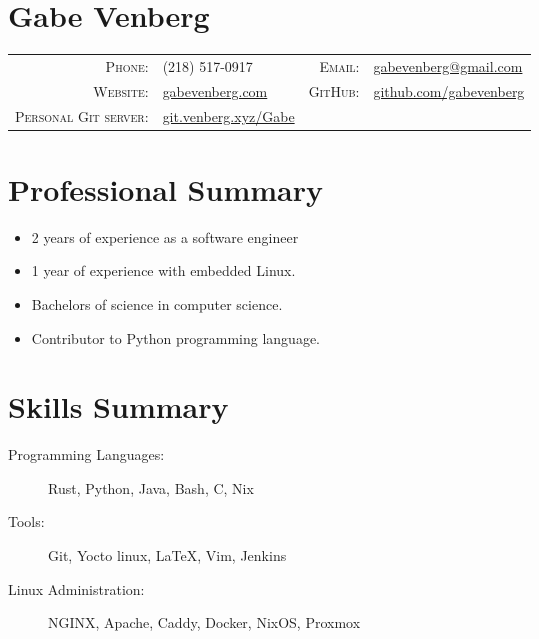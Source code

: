 \documentclass[letterpaper,10pt]{article}
\begin{document}
\pagestyle{empty}%
\section*{Gabe Venberg}
    \begin{tabular}{r l r l}
    \textsc{Phone:} & (218) 517-0917 &
    \textsc{Email:} & \href{mailto:gabevenberg@gmail.com}{gabevenberg@gmail.com}\\
    \textsc{Website:} & \href{https://gabevenberg.com}{gabevenberg.com} &
    \textsc{GitHub:} & \href{https://github.com/gabevenberg}{github.com/gabevenberg}\\
    \textsc{Personal Git server:} & \href{https://git.venberg.xyz/Gabe}{git.venberg.xyz/Gabe} &
    \end{tabular}
\section*{Professional Summary}

\begin{itemize}
    \item 2 years of experience as a software engineer
    \item 1 year of experience with embedded Linux.
    \item Bachelors of science in computer science.
    \item Contributor to Python programming language.
\end{itemize}

\section*{Skills Summary}

\begin{description}
    \item[Programming Languages:] Rust, Python, Java, Bash, C, Nix
    \item[Tools:] Git, Yocto linux, \LaTeX{}, Vim, Jenkins
    \item[Linux Administration:] NGINX, Apache, Caddy, Docker, NixOS, Proxmox
\end{description}
\end{document}
